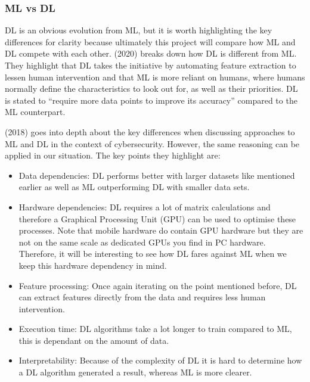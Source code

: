 \documentclass{article}
\begin{document}
\subsubsection{ML vs DL}
\label{subsec:mlvsdl}

DL is an obvious evolution from ML, but it is worth highlighting the key differences for clarity because ultimately this 
project will compare how ML and DL compete with each other. \citeauthor{kav2020} (2020) breaks down how DL is different 
from ML. They highlight that DL takes the initiative by automating feature extraction to lessen human intervention and 
that ML is more reliant on humans, where humans normally define the characteristics to look out for, as well as their 
priorities. DL is stated to “require more data points to improve its accuracy” compared to the ML counterpart.

\par

\citeauthor{8359287} (2018) goes into depth about the key differences when discussing approaches to ML and DL in the 
context of cybersecurity. However, the same reasoning can be applied in our situation. The key points they highlight 
are:

\begin{itemize}
    \item Data dependencies: DL performs better with larger datasets like mentioned earlier as well as ML 
    outperforming DL with smaller data sets.
    \item Hardware dependencies: DL requires a lot of matrix calculations and therefore a Graphical Processing 
    Unit (GPU) can be used to optimise these processes. Note that mobile hardware do contain GPU hardware but they are
    not on the same scale as dedicated GPUs you find in PC hardware. Therefore, it will be interesting to see how DL 
    fares against ML when we keep this hardware dependency in mind.
    \item Feature processing: Once again iterating on the point mentioned before, DL can extract features directly 
    from the data and requires less human intervention.
    \item Execution time: DL algorithms take a lot longer to train compared to ML, this is dependant on the amount of 
    data.
    \item Interpretability: Because of the complexity of DL it is hard to determine how a DL algorithm generated a 
    result, whereas ML is more clearer.
\end{itemize}
\end{document}

